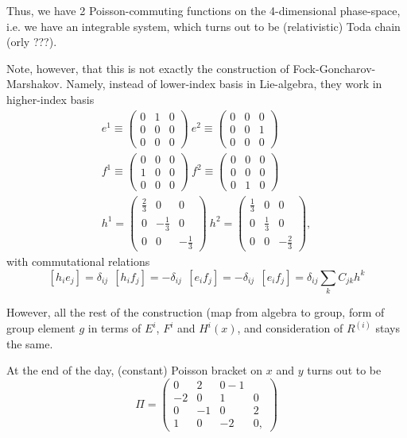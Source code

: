 \documentclass{paper}
\def\be{\begin{eqnarray}}
\def\ee{\end{eqnarray}}
\def\lb{\left (}
\def\rb{\right )}
\def\rsb{\right ]}
\begin{document}
Thus, we have 2 Poisson-commuting functions on the 4-dimensional phase-space,
i.e. we have an integrable system, which turns out to be (relativistic) Toda chain (orly ???).

Note, however, that this is not exactly the construction of Fock-Goncharov-Marshakov.
Namely, instead of lower-index basis in Lie-algebra, they work in higher-index basis
\be
e^1 \equiv \lb \begin{array}{ccc}
  0 & 1 & 0 \\
  0 & 0 & 0 \\
  0 & 0 & 0
\end{array}\rb
\
e^2 \equiv \lb \begin{array}{ccc}
  0 & 0 & 0 \\
  0 & 0 & 1 \\
  0 & 0 & 0
\end{array}\rb \nonumber
\\
f^1 \equiv \lb \begin{array}{ccc}
  0 & 0 & 0 \\
  1 & 0 & 0 \\
  0 & 0 & 0
\end{array}\rb
\
f^2 \equiv \lb \begin{array}{ccc}
  0 & 0 & 0 \\
  0 & 0 & 0 \\
  0 & 1 & 0
\end{array}\rb \nonumber
\\
h^1 = \lb \begin{array}{ccc}
  \frac{2}{3} & 0 & 0 \\
  0 & -\frac{1}{3} & 0 \\
  0 & 0 & -\frac{1}{3}
\end{array}\rb
\
h^2 = \lb \begin{array}{ccc}
  \frac{1}{3} & 0 & 0 \\
  0 & \frac{1}{3} & 0 \\
  0 & 0 & -\frac{2}{3}
\end{array}\rb, \nonumber
\ee
with commutational relations
$$
\left[  h_i e_j \rsb = \delta_{ij}\ \
\left[  h_i f_j \rsb = -\delta_{ij}\ \
\left[  e_i f_j \rsb = -\delta_{ij}\ \
\left[  e_i f_j \rsb = \delta_{ij} \sum_k C_{jk} h^k
$$

However, all the rest of the construction (map from algebra to group,
form of group element $g$ in terms of $E^i$, $F^i$ and $H^i(x)$,
and consideration of $R^{(i)}$ stays the same.

At the end of the day, (constant) Poisson bracket on $x$ and $y$ turns out to be
$$
\Pi = \lb \begin{array}{cccc}
  0 & 2 & 0 -1 \\
  -2 & 0 & 1 & 0 \\
  0 & -1 & 0 & 2 \\
  1 & 0 & -2 & 0,
\end{array}\rb
$$
\end{document}
